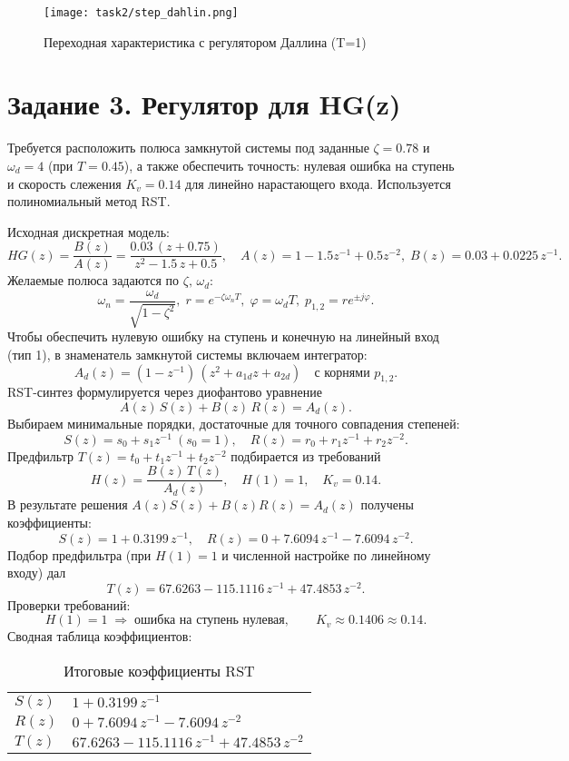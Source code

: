 \begin{figure}[H]
    \centering
    \texttt{[image: task2/step\_dahlin.png]}
    \caption{Переходная характеристика с регулятором Даллина (T=1)}
\end{figure}

% 

\section{Задание 3. Регулятор для HG(z)}
Требуется расположить полюса замкнутой системы под заданные $\zeta=0.78$ и $\omega_d=4$ (при $T=0.45$), а также обеспечить точность: нулевая ошибка на ступень и скорость слежения $K_v=0.14$ для линейно нарастающего входа. Используется полиномиальный метод RST.

Исходная дискретная модель:
\[
    HG(z) = \frac{B(z)}{A(z)} = \frac{0.03\,(z+0.75)}{z^2 - 1.5\,z + 0.5},\quad
    A(z)=1-1.5z^{-1}+0.5z^{-2},\; B(z)=0.03+0.0225\,z^{-1}.
\]
Желаемые полюса задаются по $\zeta,\,\omega_d$:
\[\omega_n = \frac{\omega_d}{\sqrt{1-\zeta^2}},\; r=e^{-\zeta\omega_n T},\; \varphi = \omega_d T,\; p_{1,2}=r e^{\pm j\varphi}.
\]
Чтобы обеспечить нулевую ошибку на ступень и конечную на линейный вход (тип 1), в знаменатель замкнутой системы включаем интегратор: 
\[
    A_d(z)=(1-z^{-1})\,(z^2 + a_{1d} z + a_{2d}) \quad \text{с корнями } p_{1,2}.
\]
RST-синтез формулируется через диофантово уравнение
\[
    A(z)\,S(z) + B(z)\,R(z) = A_d(z).
\]
Выбираем минимальные порядки, достаточные для точного совпадения степеней: 
\[
    S(z)=s_0+s_1 z^{-1}\ (s_0=1),\quad R(z)=r_0+r_1 z^{-1}+r_2 z^{-2}.
\]
Предфильтр \(T(z)=t_0+t_1 z^{-1}+t_2 z^{-2}\) подбирается из требований
\[
    H(z)=\frac{B(z)\,T(z)}{A_d(z)},\quad H(1)=1,\quad K_v=0.14.
\]
\noindent В результате решения $A(z)S(z)+B(z)R(z)=A_d(z)$ получены коэффициенты:
\[
    S(z)=\boxed{1 + 0.3199\,z^{-1}},\quad R(z)=\boxed{0 + 7.6094\,z^{-1} - 7.6094\,z^{-2}}.
\]
Подбор предфильтра (при $H(1)=1$ и численной настройке по линейному входу) дал
\[
    T(z)=\boxed{67.6263 - 115.1116\,z^{-1} + 47.4853\,z^{-2}}.
\]
Проверки требований:
\[
    H(1)=1\;\Rightarrow\; \text{ошибка на ступень нулевая},\qquad K_v\approx 0.1406 \approx 0.14.
\]
Сводная таблица коэффициентов:
\begin{table}[H]
    \centering
    \begin{tabular}{l|l}
        \toprule
        $S(z)$ & $1 + 0.3199\,z^{-1}$ \\
        $R(z)$ & $0 + 7.6094\,z^{-1} - 7.6094\,z^{-2}$ \\
        $T(z)$ & $67.6263 - 115.1116\,z^{-1} + 47.4853\,z^{-2}$ \\
        \bottomrule
    \end{tabular}
    \caption{Итоговые коэффициенты RST}
\end{table}

